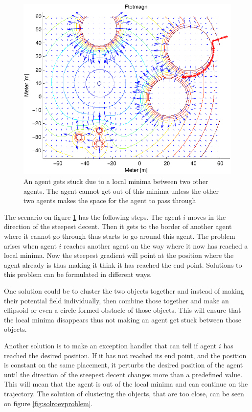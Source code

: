 \documentclass[a4paper,conference]{IEEEtran}
\begin{document}
\begin{figure}[htbp]
  \includegraphics[width=.9\linewidth]{fig/ftotmagnfigpdf3}
	\caption{An agent gets stuck due to a local minima between two other
	agents. The agent cannot get out of this minima unless the other two
	agents makes the space for the agent to pass through}
  \label{fig:roevproblem}
\end{figure}

The scenario on figure \ref{fig:roevproblem} has the following steps.
The agent $i$ moves in the direction of the steepest decent. Then it
gets to the border of another agent where it cannot go through thus
starts to go around this agent. The problem arises when agent $i$
reaches another agent on the way where it now has reached a local
minima. Now the steepest gradient will point at the position where the
agent already is thus making it think it has reached the end point.
Solutions to this problem can be formulated in different ways.

One solution could be to cluster the two objects together and instead
of making their potential field individually, then combine those
together and make an ellipsoid or even a circle formed obstacle of
those objects. This will ensure that the local minima disappears thus
not making an agent get stuck between those objects.

Another solution is to make an exception handler that can tell if
agent $i$ has reached the desired position. If it has not reached its
end point, and the position is constant on the same placement, it
perturbs the desired position of the agent until the direction of the
steepest decent changes more than a predefined value. This will mean
that the agent is out of the local minima and can continue on the
trajectory.  The solution of clustering the objects, that are too
close, can be seen on figure \ref{fig:solroevproblem}.
\end{document}
